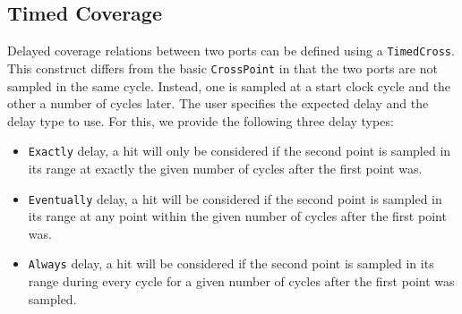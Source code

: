 \documentclass[conference]{IEEEtran}
\begin{document}
\subsection{Timed Coverage}
Delayed coverage relations between two ports can be defined using a \texttt{TimedCross}. This construct differs from the basic \texttt{CrossPoint} in that the two ports are not sampled in the same cycle. Instead, one is sampled at a start clock cycle and the other a number of cycles later. The user specifies the expected delay and the delay type to use. For this, we provide the following three delay types:%
\begin{itemize}
 \item \texttt{Exactly} delay, a hit will only be considered if the second point is sampled in its range at exactly the given number of cycles after the first point was.
 \item \texttt{Eventually} delay, a hit will be considered if the second point is sampled in its range at any point within the given number of cycles after the first point was.  
 \item \texttt{Always} delay, a hit will be considered if the second point is sampled in its range during every cycle for a given number of cycles after the first point was sampled.
\end{itemize}  
\end{document}
